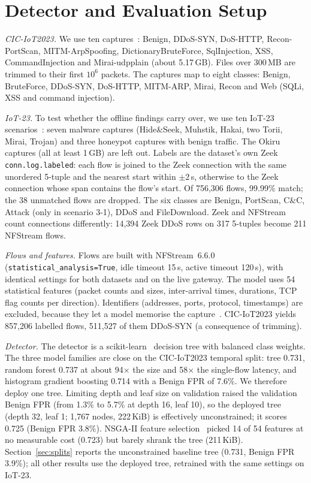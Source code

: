\section{Detector and Evaluation Setup}\label{sec:setup}

\emph{CIC-IoT2023.} We use ten captures~\cite{neto2023ciciot2023}: Benign, DDoS-SYN, DoS-HTTP, Recon-PortScan, MITM-ArpSpoofing, DictionaryBruteForce, SqlInjection, XSS, CommandInjection and Mirai-udpplain (about 5.17\,GB). Files over 300\,MB are trimmed to their first $10^6$ packets. The captures map to eight classes: Benign, BruteForce, DDoS-SYN, DoS-HTTP, MITM-ARP, Mirai, Recon and Web (SQLi, XSS and command injection).

\emph{IoT-23.} To test whether the offline findings carry over, we use ten IoT-23 scenarios~\cite{garcia2020iot23}: seven malware captures (Hide\&Seek, Muhstik, Hakai, two Torii, Mirai, Trojan) and three honeypot captures with benign traffic. The Okiru captures (all at least 1\,GB) are left out. Labels are the dataset's own Zeek \texttt{conn.log.labeled}: each flow is joined to the Zeek connection with the same unordered 5-tuple and the nearest start within $\pm2$\,s, otherwise to the Zeek connection whose span contains the flow's start. Of 756,306 flows, 99.99\% match; the 38 unmatched flows are dropped. The six classes are Benign, PortScan, C\&C, Attack (only in scenario 3-1), DDoS and FileDownload. Zeek and NFStream count connections differently: 14,394 Zeek DDoS rows on 317 5-tuples become 211 NFStream flows.

\emph{Flows and features.} Flows are built with NFStream~6.6.0~\cite{aouini2022nfstream} (\texttt{statistical\_analysis=True}, idle timeout 15\,s, active timeout 120\,s), with identical settings for both datasets and on the live gateway. The model uses 54 statistical features (packet counts and sizes, inter-arrival times, durations, TCP flag counts per direction). Identifiers (addresses, ports, protocol, timestamps) are excluded, because they let a model memorise the capture~\cite{arp2022dos}. CIC-IoT2023 yields 857,206 labelled flows, 511,527 of them DDoS-SYN (a consequence of trimming).

\emph{Detector.} The detector is a scikit-learn~\cite{pedregosa2011sklearn} decision tree with balanced class weights. The three model families are close on the CIC-IoT2023 temporal split: tree 0.731, random forest 0.737 at about 94$\times$ the size and 58$\times$ the single-flow latency, and histogram gradient boosting 0.714 with a Benign FPR of 7.6\%. We therefore deploy one tree. Limiting depth and leaf size on validation raised the validation Benign FPR (from 1.3\% to 5.7\% at depth 16, leaf 10), so the deployed tree (depth 32, leaf 1; 1,767 nodes, 222\,KiB) is effectively unconstrained; it scores 0.725 (Benign FPR 3.8\%). NSGA-II feature selection~\cite{deb2002nsga2,blank2020pymoo} picked 14 of 54 features at no measurable cost (0.723) but barely shrank the tree (211\,KiB). Section~\ref{sec:splits} reports the unconstrained baseline tree (0.731, Benign FPR 3.9\%); all other results use the deployed tree, retrained with the same settings on IoT-23.


